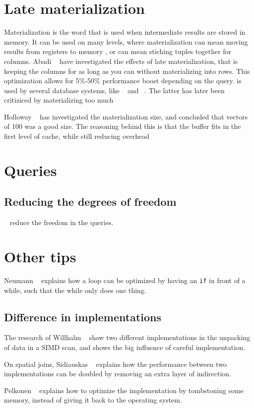 \section{Late materialization}
\label{sec:Late materialization}
Materialization is the word that is used when intermediate results are stored in memory. It can be used on many levels, where materialization can mean moving results from registers to memory \cite{Neumann2011-uq}, or can mean stiching tuples together for columns. Abadi \ea~\cite{Abadi2008-dd} have investigated the effects of late materialization, that is keeping the columns for as long as you can without materializing into rows. This optimization allows for 5\%-50\% performance boost depending on the query.  is used by several database systems, like \ibm~\cite{Raman2013-em} and \monetdb~\cite{Boncz2002-yj}. The latter has later been critiziced by materializing too much \cite{Boncz2005-wj}

Holloway \ea~\cite{Holloway2008-rr} has investigated the materialization size, and concluded that vectors of 100 was a good size. The reasoning behind this is that the buffer fits in the first level of cache, while still reducing overhead

\section{Queries}
\label{sec:Queries}

\subsection{Reducing the degrees of freedom}
\label{sub:Reducing the degrees of freedom}
\monetdb~\cite{Boncz2005-wj} reduce the freedom in the queries.


\section{Other tips}
\label{sec:Other tips}
Neumann \ea~\cite{Neumann2011-uq} explains how a loop can be optimized by having an \texttt{if} in front of a while, such that the while only does one thing.

\subsection{Difference in implementations}
\label{sub:Difference in implementations}
The research of Willhalm \ea~\cite{Willhalm2013-ri} show two different implementations in the unpacking of data in a SIMD scan, and shows the big influence of careful implementation.

On spatial joins, Sidiauskas \ea~\cite{Sidiauskas2014-ef} explains how the performance between two implementations can be doubled by removing an extra layer of indirection.

Pelkonen \ea~\cite{Pelkonen2015-ko} explains how to optimize the implementation by tombstoning some memory, instead of giving it back to the operating system.

